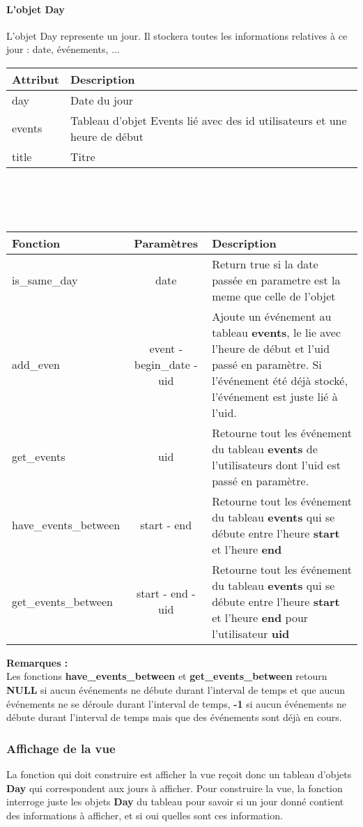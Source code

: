 \paragraph{L'objet Day}
 L'objet Day represente un jour. Il stockera toutes les informations relatives à
 ce jour : date, événements, ... 
 \\
 \begin{tabular}{|l|p{9.5cm}|}
  \hline
   \textbf{Attribut} & \textbf{Description} \\
  \hline
   day & Date du jour \\
  \hline
   events & Tableau d'objet Events lié avec des id utilisateurs et une heure de
   début \\
  \hline
   title & Titre \\
  \hline
 \end{tabular}
 \\
 \\
 \\
 \begin{tabular}{|l|c|p{9.5cm}|}
  \hline
   \textbf{Fonction} & \textbf{Paramètres} & \textbf{Description} \\
  \hline
   is\_same\_day & date & Return true si la date passée en parametre est la meme
   que celle de l'objet\\
  \hline
   add\_even & event - begin\_date - uid & Ajoute un événement au tableau
   \textbf{events}, le lie avec l'heure de début et l'uid passé en paramètre. Si
   l'événement été déjà stocké, l'événement est juste lié à l'uid.\\
  \hline
   get\_events & uid & Retourne tout les événement du tableau \textbf{events} 
   de l'utilisateurs dont l'uid est passé en paramètre.\\
  \hline
  \hline
   have\_events\_between & start - end & Retourne tout les événement du tableau \textbf{events} 
   qui se débute entre l'heure \textbf{start} et l'heure \textbf{end} \\
  \hline
   get\_events\_between & start - end - uid & Retourne tout les événement du tableau \textbf{events} 
   qui se débute entre l'heure \textbf{start} et l'heure \textbf{end} pour
   l'utilisateur \textbf{uid} \\
  \hline
 \end{tabular}
  \textbf{Remarques :} \\
  Les fonctions \textbf{have\_events\_between} et \textbf{get\_events\_between}
  retourn \textbf{NULL} si aucun événements ne débute durant l'interval de
  temps et que aucun événements ne se déroule durant l'interval de
  temps, \textbf{-1} si aucun événements ne débute durant l'interval de
  temps mais que des événements sont déjà en cours.
  
 \subsubsection{Affichage de la vue}
   La fonction qui doit construire est afficher la vue reçoit donc un tableau
   d'objets \textbf{Day} qui correspondent aux jours à afficher.
   Pour construire la vue, la fonction interroge juste les objets \textbf{Day}
   du tableau pour savoir si un jour donné contient des informations à afficher,
   et si oui quelles sont ces information.

